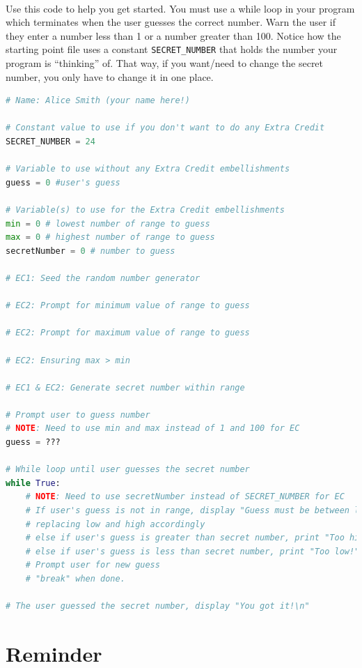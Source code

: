 \documentclass[letter,10pt]{article}
\begin{document}
    \paragraph{}Use this code to help you get started. You must use a while loop in your program which terminates when the user guesses the correct number. Warn the user if they enter a number less than 1 or a number greater than 100. Notice how the starting point file uses a constant \texttt{SECRET\_NUMBER} that holds the number your program is ``thinking'' of. That way, if you want/need to change the secret number, you only have to change it in one place.
    \begin{lstlisting}[language=python]
# Name: Alice Smith (your name here!)

# Constant value to use if you don't want to do any Extra Credit
SECRET_NUMBER = 24

# Variable to use without any Extra Credit embellishments
guess = 0 #user's guess

# Variable(s) to use for the Extra Credit embellishments
min = 0 # lowest number of range to guess
max = 0 # highest number of range to guess
secretNumber = 0 # number to guess

# EC1: Seed the random number generator

# EC2: Prompt for minimum value of range to guess

# EC2: Prompt for maximum value of range to guess

# EC2: Ensuring max > min

# EC1 & EC2: Generate secret number within range

# Prompt user to guess number
# NOTE: Need to use min and max instead of 1 and 100 for EC
guess = ???

# While loop until user guesses the secret number
while True:
    # NOTE: Need to use secretNumber instead of SECRET_NUMBER for EC
    # If user's guess is not in range, display "Guess must be between low and high!",
    # replacing low and high accordingly
    # else if user's guess is greater than secret number, print "Too high!"
    # else if user's guess is less than secret number, print "Too low!"
    # Prompt user for new guess
    # "break" when done.

# The user guessed the secret number, display "You got it!\n"
    \end{lstlisting}

    \section*{Reminder}
\end{document}
